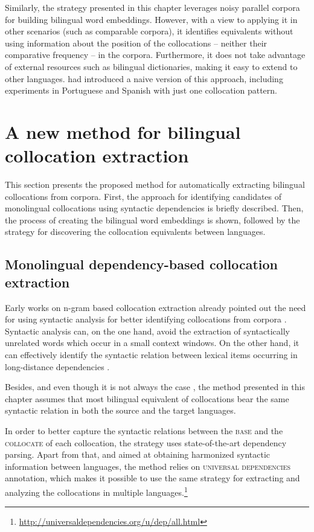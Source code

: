\documentclass[output=paper
,modfonts
,nonflat]{langsci/langscibook}
\begin{document}
Similarly, the strategy presented in this chapter leverages noisy parallel corpora for building
bilingual word embeddings. However, with a view to applying it in other scenarios (such as comparable
corpora), it identifies equivalents without using information about the position of the collocations
-- neither their comparative frequency -- in the corpora. Furthermore, it does not take advantage
of external resources such as bilingual dictionaries, making it easy to extend to other languages.
\citet{pacorbook} had introduced a naive version of this approach, including experiments in Portuguese and Spanish with just one collocation pattern.


%
\section{A new method for bilingual collocation extraction}
\label{garcia:sec:method}
This section presents the proposed method for automatically extracting bilingual collocations from corpora.
First, the approach for identifying candidates of monolingual collocations using syntactic dependencies
is briefly described. Then, the process of creating the bilingual word embeddings is shown,
followed by the strategy for discovering the collocation equivalents between languages.

%
\subsection{Monolingual dependency-based collocation extraction}
\label{garcia:sec:monolingual}
Early works on n-gram based collocation extraction already pointed out the
need for using syntactic analysis for better identifying collocations from corpora
\citep{smadja1993,lin1999}. Syntactic analysis can, on the one hand, avoid the
extraction of syntactically unrelated words which occur in a small context
windows. On the other hand, it can effectively identify the syntactic relation
between lexical items occurring in long-distance dependencies \citep{evert2008}.

Besides, and even though it is not always the case \citep{lu2004}, the method presented
in this chapter assumes that most bilingual equivalent of collocations bear the same syntactic
relation in both the source and the target languages.

In order to better capture the syntactic relations between the \textsc{base} and
the \textsc{collocate} of each collocation, the strategy uses state-of-the-art dependency
parsing. Apart from that, and aimed at obtaining harmonized syntactic information
between languages, the method relies on \textsc{universal dependencies} annotation,
which makes it possible to use the same strategy for extracting and analyzing the collocations in multiple
languages.\footnote{\scriptsize{\url{http://universaldependencies.org/u/dep/all.html}}}
\end{document}
